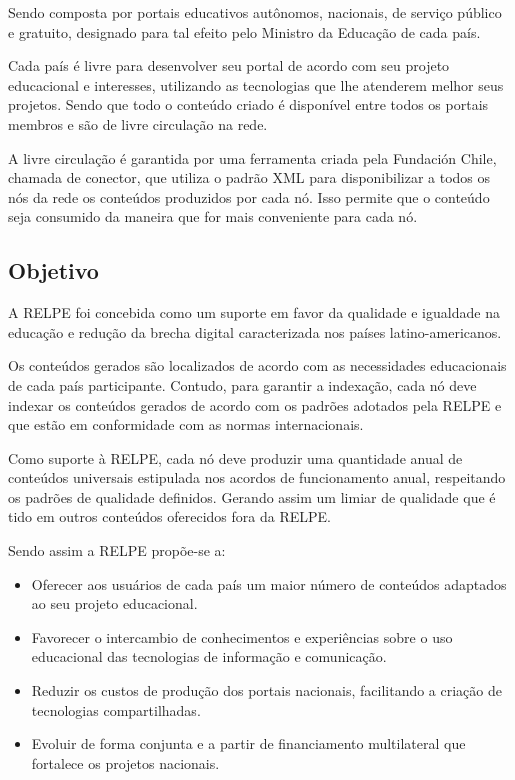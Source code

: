     Sendo composta por portais educativos autônomos, nacionais, de serviço
    público e gratuito, designado para tal efeito pelo Ministro da Educação
    de cada país.

    Cada país é livre para desenvolver seu portal de acordo com seu projeto
    educacional e interesses, utilizando as tecnologias que lhe atenderem
    melhor seus projetos. Sendo que todo o conteúdo criado é disponível
    entre todos os portais membros e são de livre circulação na rede.

    A livre circulação é garantida por uma ferramenta criada pela Fundación
    Chile, chamada de conector, que utiliza o padrão XML para disponibilizar
    a todos os nós da rede os conteúdos produzidos por cada nó. Isso permite
    que o conteúdo seja consumido da maneira que for mais conveniente para
    cada nó.

        \subsection{Objetivo}
        A RELPE foi concebida como um suporte em favor da qualidade e
        igualdade na educação e redução da brecha digital caracterizada nos
        países latino-americanos.

        Os conteúdos gerados são localizados de acordo com as necessidades
        educacionais de cada país participante. Contudo, para garantir a
        indexação, cada nó deve indexar os conteúdos gerados de acordo com
        os padrões adotados pela RELPE e que estão em conformidade com as
        normas internacionais.

        Como suporte à RELPE, cada nó deve produzir uma quantidade anual de
        conteúdos universais estipulada nos acordos de funcionamento anual,
        respeitando os padrões de qualidade definidos. Gerando assim um
        limiar de qualidade que é tido em outros conteúdos oferecidos fora
        da RELPE.

        Sendo assim a RELPE propõe-se a:

        \begin{itemize}

            \item Oferecer aos usuários de cada país um maior número de
            conteúdos adaptados ao seu projeto educacional.

            \item Favorecer o intercambio de conhecimentos e experiências
            sobre o uso educacional das tecnologias de informação e
            comunicação.

            \item Reduzir os custos de produção dos portais nacionais,
            facilitando a criação de tecnologias compartilhadas.

            \item Evoluir de forma conjunta e a partir de financiamento
            multilateral que fortalece os projetos nacionais.

        \end{itemize}

